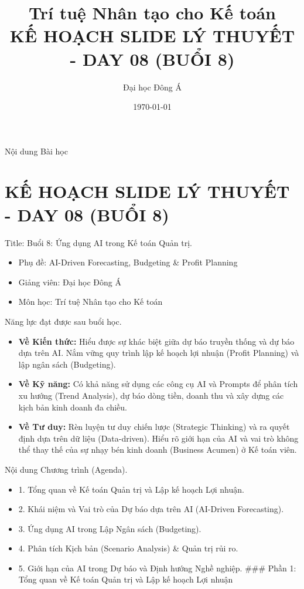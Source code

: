 \documentclass[aspectratio=169]{beamer}
\title[Trí tuệ Nhân tạo cho Kế toán]{Trí tuệ Nhân tạo cho Kế toán \\ \vspace{0.3cm} \Large KẾ HOẠCH SLIDE LÝ THUYẾT - DAY 08 (BUỔI 8)}
\author{Đại học Đông Á}
\date{\today}
\begin{document}
\begin{frame}
    \titlepage
\end{frame}

\begin{frame}{Nội dung Bài học}
    \tableofcontents
\end{frame}


\section{KẾ HOẠCH SLIDE LÝ THUYẾT - DAY 08 (BUỔI 8)}


\begin{frame}{Title: Buổi 8: Ứng dụng AI trong Kế toán Quản trị.}
    \begin{itemize}
        \item Phụ đề: AI-Driven Forecasting, Budgeting \& Profit Planning
        \item Giảng viên: Đại học Đông Á
        \item Môn học: Trí tuệ Nhân tạo cho Kế toán
    \end{itemize}
\end{frame}


\begin{frame}{Năng lực đạt được sau buổi học.}
    \begin{itemize}
        \item \textbf{Về Kiến thức:} Hiểu được sự khác biệt giữa dự báo truyền thống và dự báo dựa trên AI. Nắm vững quy trình lập kế hoạch lợi nhuận (Profit Planning) và lập ngân sách (Budgeting).
        \item \textbf{Về Kỹ năng:} Có khả năng sử dụng các công cụ AI và Prompts để phân tích xu hướng (Trend Analysis), dự báo dòng tiền, doanh thu và xây dựng các kịch bản kinh doanh đa chiều.
        \item \textbf{Về Tư duy:} Rèn luyện tư duy chiến lược (Strategic Thinking) và ra quyết định dựa trên dữ liệu (Data-driven). Hiểu rõ giới hạn của AI và vai trò không thể thay thế của sự nhạy bén kinh doanh (Business Acumen) ở Kế toán viên.
    \end{itemize}
\end{frame}


\begin{frame}{Nội dung Chương trình (Agenda).}
    \begin{itemize}
        \item 1. Tổng quan về Kế toán Quản trị và Lập kế hoạch Lợi nhuận.
        \item 2. Khái niệm và Vai trò của Dự báo dựa trên AI (AI-Driven Forecasting).
        \item 3. Ứng dụng AI trong Lập Ngân sách (Budgeting).
        \item 4. Phân tích Kịch bản (Scenario Analysis) \& Quản trị rủi ro.
        \item 5. Giới hạn của AI trong Dự báo và Định hướng Nghề nghiệp.
        ### Phần 1: Tổng quan về Kế toán Quản trị và Lập kế hoạch Lợi nhuận
    \end{itemize}
\end{frame}
\end{document}
